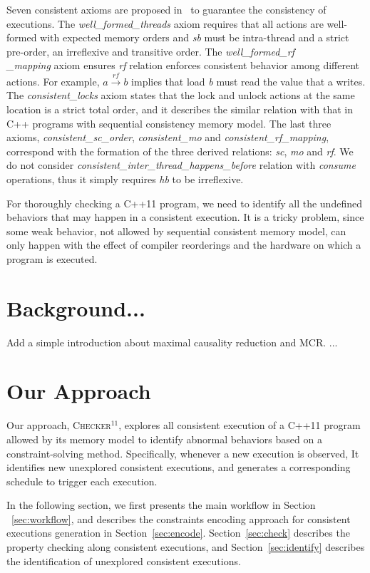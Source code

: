 \documentclass[preprint, numbers, 10pt]{sigplanconf}
\newcommand{\checker}{\textsc{Checker$^{11}$}}
\begin{document}
Seven consistent axioms are proposed in~\citep{Batty:2011} to guarantee
the consistency of executions. 
The \textit{well\_formed\_threads} axiom requires that all actions are well-formed 
with expected memory orders and \textit{sb} must 
be intra-thread and a strict pre-order, an irreflexive and transitive order. 
The \textit{well\_formed\_rf\\\_mapping} axiom ensures \textit{rf} relation
enforces consistent behavior among different actions. For example, 
$a \stackrel{rf}{\longrightarrow} b$ implies that load \textit{b}
must read the value that a writes. 
The \textit{consistent\_locks} axiom states that the lock and unlock actions
at the same location is a strict total order, and it describes the similar
relation with that in C++ programs with sequential consistency memory model. 
The last three axioms, \textit{consistent\_sc\_order}, \textit{consistent\_mo} 
and \textit{consistent\_rf\_mapping}, correspond with the formation of the 
three derived relations: \textit{sc}, \textit{mo} and \textit{rf}. 
We do not consider \textit{consistent\_inter\_thread\_happens\_before}
relation with \textit{consume} operations, thus it simply requires \textit{hb} to 
be irreflexive. 

For thoroughly checking a C++11 program, we need to identify all the undefined
behaviors that may happen in a consistent execution. It is a tricky problem, since 
some weak behavior, not allowed by sequential consistent memory model,
can only happen with the effect of compiler reorderings and the hardware on 
which a program is executed. 

\section{Background...}
Add a simple introduction about maximal causality reduction and MCR. ...

\section{Our Approach}
\label{sec:approach}

Our approach, \checker, explores all consistent execution of a C++11 program allowed
by its memory model to identify abnormal behaviors based on
a constraint-solving method. Specifically, whenever a new execution is observed,
It identifies new unexplored consistent executions, and generates a corresponding schedule to
trigger each execution. 

In the following section, we first presents the main workflow in Section
~\ref{sec:workflow}, and describes the constraints encoding approach for 
consistent executions generation in Section~\ref{sec:encode}. 
Section~\ref{sec:check} describes the property checking along consistent executions, and 
Section~\ref{sec:identify} describes the identification of unexplored consistent executions. 
\end{document}
